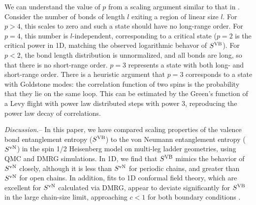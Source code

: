 \documentclass[prl,aps,twocolumn,floatfix,amsmath,amssymb,superscriptaddress,tightenlines]{revtex4}
\begin{document}
We can understand the value of $p$ from a scaling argument similar to that in \cite{network}.
Consider the number of bonds of length $l$ exiting a region of linear size $l$.  For $p>4$, this
scales to zero and such a state should have no long-range order.
For $p=4$, this number is $l$-independent, corresponding to a critical
state ($p=2$ is the critical power in 1D, matching the
observed logarithmic behavor of $S^{\rm VB}$).
For $p<2$, the bond length distribution is unnormalized, and all bonds are long, so that
there is no short-range order.  $p=3$ represents a state with both long-
and short-range order.  There is a heuristic argument that $p=3$ corresponds to a state
with Goldstone modes: the correlation function of two spins is the
probability that they lie on the same loop.  This can be
estimated by
the Green's function of a Levy flight with power law distributed steps with power $3$,
reproducing the power law decay of correlations.



{\it Discussion.}-- In this paper, we have compared scaling properties of
the valence bond entanglement entropy ($S^{\rm VB}$) \cite{Alet,Chh} to the von Neumann entanglement entropy ($S^{ \rm vN}$) in the
spin 1/2 Heisenberg model on multi-leg ladder geometries, using QMC and DMRG simulations.
In 1D, we find
that $S^{\rm VB}$ mimics the behavior of $S^{ \rm vN}$ closely, although 
it is less than $S^{ \rm vN}$ for periodic
chains, and greater than $S^{ \rm vN}$ for open chains. In addition, fits to
1D conformal field theory, which are excellent for $S^{ \rm vN}$ calculated
via DMRG, appear to deviate significantly for $S^{\rm VB}$ in the large
chain-size limit, approaching $c<1$ for both boundary conditions \cite{XXX}.

\end{document}
